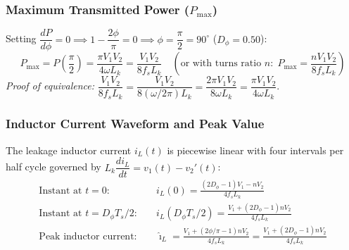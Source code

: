 \subsubsection{Maximum Transmitted Power ($P_{\max}$)}
Setting $\dfrac{dP}{d\phi} = 0 \implies 1 - \dfrac{2\phi}{\pi} = 0 \implies \phi = \dfrac{\pi}{2} = 90^\circ$ ($D_\phi = 0.50$):
\begin{equation}
P_{\max} = P\left(\frac{\pi}{2}\right) = \frac{\pi V_1 V_2}{4 \omega L_k} = \frac{V_1 V_2}{8 f_s L_k} \quad \left(\text{or with turns ratio } n:\; P_{\max} = \frac{n V_1 V_2}{8 f_s L_k}\right)
\end{equation}
\noindent\textit{Proof of equivalence:} $\dfrac{V_1 V_2}{8 f_s L_k} = \dfrac{V_1 V_2}{8 (\omega / 2\pi) L_k} = \dfrac{2\pi V_1 V_2}{8 \omega L_k} = \dfrac{\pi V_1 V_2}{4 \omega L_k}$.

\subsubsection{Inductor Current Waveform and Peak Value}
The leakage inductor current $i_L(t)$ is piecewise linear with four intervals per half cycle governed by $L_k \dfrac{di_L}{dt} = v_1(t) - v_2'(t)$:
\begin{align}
\text{Instant at } t = 0: \quad & i_L(0) = \frac{(2 D_\phi - 1) V_1 - n V_2}{4 f_s L_k} \\
\text{Instant at } t = D_\phi T_s / 2: \quad & i_L(D_\phi T_s / 2) = \frac{V_1 + (2 D_\phi - 1) n V_2}{4 f_s L_k} \\
\text{Peak inductor current:} \quad & \hat{\imath}_L = \frac{V_1 + (2\phi/\pi - 1) n V_2}{4 f_s L_k} = \frac{V_1 + (2 D_\phi - 1) n V_2}{4 f_s L_k}
\end{align}

